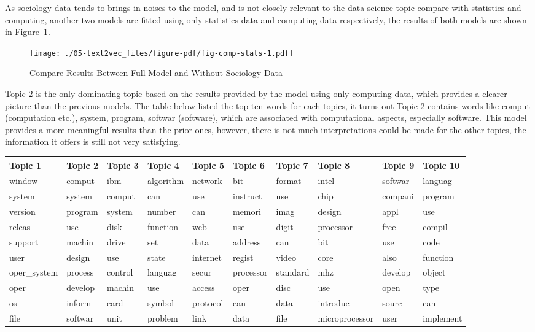 \documentclass[
  letterpaper,
  DIV=11,
  numbers=noendperiod]{scrreport}
\begin{document}
As sociology data tends to brings in noises to the model, and is not
closely relevant to the data science topic compare with statistics and
computing, another two models are fitted using only statistics data and
computing data respectively, the results of both models are shown in
Figure~\ref{fig-comp-stats}.

\begin{figure}

{\centering \texttt{[image: ./05-text2vec\_files/figure-pdf/fig-comp-stats-1.pdf]}

}

\caption{\label{fig-comp-stats}Compare Results Between Full Model and
Without Sociology Data}

\end{figure}

Topic 2 is the only dominating topic based on the results provided by
the model using only computing data, which provides a clearer picture
than the previous models. The table below listed the top ten words for
each topics, it turns out Topic 2 contains words like comput
(computation etc.), system, program, softwar (software), which are
associated with computational aspects, especially software. This model
provides a more meaningful results than the prior ones, however, there
is not much interpretations could be made for the other topics, the
information it offers is still not very satisfying.

\begin{table}
\centering
\begin{tabular}{l|l|l|l|l|l|l|l|l|l}
\hline
Topic 1 & Topic 2 & Topic 3 & Topic 4 & Topic 5 & Topic 6 & Topic 7 & Topic 8 & Topic 9 & Topic 10\\
\hline
window & comput & ibm & algorithm & network & bit & format & intel & softwar & languag\\
\hline
system & system & comput & can & use & instruct & use & chip & compani & program\\
\hline
version & program & system & number & can & memori & imag & design & appl & use\\
\hline
releas & use & disk & function & web & use & digit & processor & free & compil\\
\hline
support & machin & drive & set & data & address & can & bit & use & code\\
\hline
user & design & use & state & internet & regist & video & core & also & function\\
\hline
oper\_system & process & control & languag & secur & processor & standard & mhz & develop & object\\
\hline
oper & develop & machin & use & access & oper & disc & use & open & type\\
\hline
os & inform & card & symbol & protocol & can & data & introduc & sourc & can\\
\hline
file & softwar & unit & problem & link & data & file & microprocessor & user & implement\\
\hline
\end{tabular}
\end{table}
\end{document}

